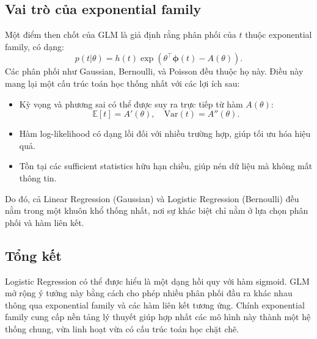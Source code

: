 \subsection{Vai trò của exponential family}
Một điểm then chốt của GLM là giả định rằng phân phối của $t$ thuộc
exponential family, có dạng:
\begin{equation}
p(t|\theta) = h(t)\exp\left(\theta^\intercal \boldsymbol{\phi}(t) - A(\theta)
\right).
\end{equation}
Các phân phối như Gaussian, Bernoulli, và Poisson đều thuộc họ này. Điều này
mang lại một cấu trúc toán học thống nhất với các lợi ích sau:
\begin{itemize}
    \item Kỳ vọng và phương sai có thể được suy ra trực tiếp từ hàm $A(\theta)
    $:
    \begin{equation}
    \mathbb{E}[t] = A'(\theta), \quad \mathrm{Var}(t) = A''(\theta).
    \end{equation}
    \item Hàm log-likelihood có dạng lồi đối với nhiều trường hợp, giúp tối ưu
    hóa hiệu quả.
    \item Tồn tại các sufficient statistics hữu hạn chiều, giúp nén dữ liệu mà
    không mất thông tin.
\end{itemize}
Do đó, cả Linear Regression (Gaussian) và Logistic Regression (Bernoulli) đều
nằm trong một khuôn khổ thống nhất, nơi sự khác biệt chỉ nằm ở lựa chọn phân
phối và hàm liên kết.

\subsection{Tổng kết}
Logistic Regression có thể được hiểu là một dạng hồi quy với hàm sigmoid. GLM
mở rộng ý tưởng này bằng cách cho phép nhiều phân phối đầu ra khác nhau thông
qua exponential family và các hàm liên kết tương ứng. Chính exponential family
cung cấp nền tảng lý thuyết giúp hợp nhất các mô hình này thành một hệ thống
chung, vừa linh hoạt vừa có cấu trúc toán học chặt chẽ.
